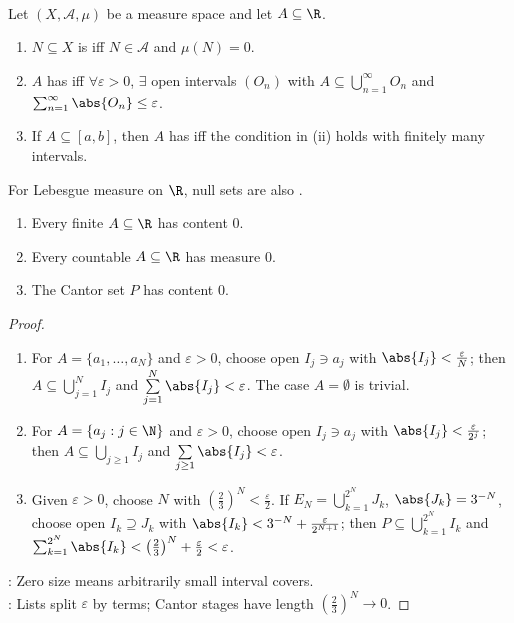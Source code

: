 \begin{definition} \label{def:null-sets-and-real-line-measure-zero} \\
Let $(X,\mathcal{A},\mu)$ be a measure space and let $A\subseteq\R$.
\begin{enumerate}[label=(\roman*)]
\setlength{\itemsep}{0pt}
\item $N\subseteq X$ is  iff $N\in\mathcal{A}$ and $\mu(N)=0$.
\item $A$ has  iff $\forall\varepsilon>0$, $\exists$ open intervals $(O_n)$ with $A\subseteq\bigcup_{n=1}^{\infty}O_n$ and $\sum_{n=1}^{\infty}\abs{O_n}\leq\varepsilon$.
\item If $A\subseteq[a,b]$, then $A$ has  iff the condition in (ii) holds with finitely many intervals.
\end{enumerate}
For Lebesgue measure on $\R$, null sets are also .
\end{definition}

\begin{proposition} \label{prop:finite-countable-cantor-null-sets} 
\begin{enumerate}[label=(\roman*)]
\setlength{\itemsep}{0pt}
\item Every finite $A\subseteq\R$ has content $0$.
\item Every countable $A\subseteq\R$ has measure $0$.
\item The Cantor set $P$ has content $0$.
\end{enumerate}
\begin{proof}
\begin{enumerate}[label=(\roman*)]
\setlength{\itemsep}{0pt}
\item For $A=\{a_1,\ldots,a_N\}$ and $\varepsilon>0$, choose open $I_j\ni a_j$ with $\abs{I_j}<\frac{\varepsilon}{N}$; then $A\subseteq\bigcup\limits_{j=1}^{N}I_j$ and $\sum\limits_{j=1}^{N}\abs{I_j}<\varepsilon$. The case $A=\emptyset$ is trivial.
\item For $A=\{a_j:j\in\N\}$ and $\varepsilon>0$, choose open $I_j\ni a_j$ with $\abs{I_j}<\frac{\varepsilon}{2^j}$; then $A\subseteq\bigcup\limits_{j\geq1}I_j$ and $\sum\limits_{j\geq1}\abs{I_j}<\varepsilon$.
\item Given $\varepsilon>0$, choose $N$ with $\left(\frac{2}{3}\right)^N<\frac{\varepsilon}{2}$. If $E_N=\bigcup_{k=1}^{2^N}J_k$, $\abs{J_k}=3^{-N}$, choose open $I_k\supseteq J_k$ with $\abs{I_k}<3^{-N}+\frac{\varepsilon}{2^{N+1}}$; then $P\subseteq\bigcup_{k=1}^{2^N}I_k$ and $\sum_{k=1}^{2^N}\abs{I_k}<\left(\frac{2}{3}\right)^N+\frac{\varepsilon}{2}<\varepsilon$.
\end{enumerate}
: Zero size means arbitrarily small interval covers.\\
: Lists split $\varepsilon$ by terms; Cantor stages have length $(\frac{2}{3})^N\to0$.
\end{proof}
\end{proposition}

